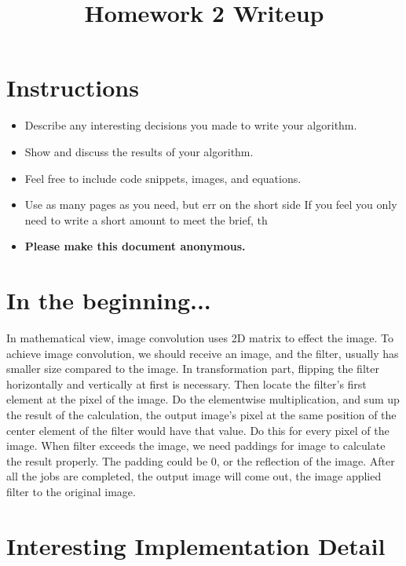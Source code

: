 \date{}

\title{\vspace{-1cm}Homework 2 Writeup}



\maketitle
\vspace{-3cm}
\thispagestyle{fancy}

\section*{Instructions}
\begin{itemize}
  \item Describe any interesting decisions you made to write your algorithm.
  \item Show and discuss the results of your algorithm.
  \item Feel free to include code snippets, images, and equations.
  \item Use as many pages as you need, but err on the short side If you feel you only need to write a short amount to meet the brief, th
  
  \item \textbf{Please make this document anonymous.}
\end{itemize}

\section*{In the beginning...}

In mathematical view, image convolution uses 2D matrix to effect the image. To achieve image convolution, we should receive an image, and the filter, usually has smaller size compared to the image.
In transformation part, flipping the filter horizontally and vertically at first is necessary. Then locate the filter's first element at the pixel of the image. Do the elementwise multiplication, and sum up the result of the calculation, the output image's pixel at the same position of the center element of the filter would have that value.
Do this for every pixel of the image. When filter exceeds the image, we need paddings for image to calculate the result properly. The padding could be 0, or the reflection of the image.
After all the jobs are completed, the output image will come out, the image applied filter to the original image.

\section*{Interesting Implementation Detail}

